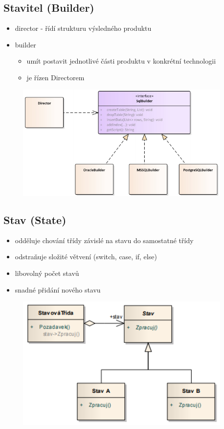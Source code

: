 \documentclass{szzclass}
\begin{document}
\subsection{Stavitel (Builder)}
\begin{itemize}
    \item director - řídí strukturu výsledného produktu
    \item builder
    \begin{itemize}
        \item umít postavit jednotlivé části produktu v konkrétní technologii
        \item je řízen Directorem
    \end{itemize}
\end{itemize}
\begin{figure}[h!]
    \includegraphics[width=0.95\textwidth]{topics/bi-wsi-si-19/images/builder.png}
\end{figure}
\newpage
\subsection{Stav (State)}
\begin{itemize}
    \item odděluje chování třídy závislé na stavu do samostatné třídy
    \item odstraňuje složité větvení (switch, case, if, else)
    \item libovolný počet stavů
    \item snadné přidání nového stavu
\end{itemize}
\begin{figure}[h!]
    \includegraphics[width=0.95\textwidth]{topics/bi-wsi-si-19/images/state.png}
\end{figure}
\end{document}
